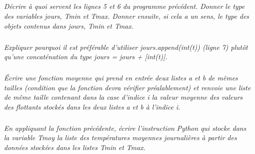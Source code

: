 \documentclass[10pt]{article}
\newif\ifprof
\begin{document}
\subparagraph{}
\textit{Décrire à quoi servent les lignes 5 et 6 du programme précédent. Donner le type des variables jours,
\textsf{Tmin} et \textsf{Tmax}. Donner ensuite, si cela a un sens, le type des objets contenus dans \textsf{jours}, \textsf{Tmin} et \textsf{Tmax}.}
\ifprof
\begin{corrige}
La ligne 5 permet d'ignorer les lignes (de commentaires) contenant le caractère \#.
La ligne 6 permet de diviser une ligne en 3 chaînes de caractères. La ligne est séparée par les points virgules.

\textsf{jours} est une liste d'entiers. \textsf{Tmin} et \textsf{Tmax} sont des listes de flottants. 

\end{corrige}
\else
\fi


\subparagraph{}
\textit{Expliquer pourquoi il est préférable d’utiliser \textsf{jours.append(int(t))} (ligne 7) plutôt qu’une concaténation du type \textsf{jours = jours + [int(t)]}.}
\ifprof
\begin{corrige}
La méthode \textsf{append} permet d'ajouter un élément à la liste sans changer sa référence (son adresse). 

Lors de la concaténation, un nouvel objet (avec une nouvelle adresse est crée). On peut supposer que lorsque la liste grandie, une concaténation et la création d'un nouvel objet prendra davantage de temps que l'utilisation de la méthode \textsf{append}.
\end{corrige}
\else
\fi


\subparagraph{}
\textit{Écrire une fonction \textsf{moyenne} qui prend en entrée deux listes \textsf{a} et \textsf{b} de mêmes tailles (condition que
la fonction devra vérifier préalablement) et renvoie une liste de même taille contenant dans la case
d’indice \textsf{i} la valeur moyenne des valeurs des flottants stockés dans les deux listes \textsf{a} et \textsf{b} à l’indice \textsf{i}.}
\ifprof
\begin{corrige}
\begin{py}
\begin{python}
def moyenne(a,b):
    if(len(a)!=len(b)):
        return None
    moy = []
    for i in range(len(a)):
        moy.append((a[i]+b[i])/2)
    return moy
\end{python}
\end{py}

\end{corrige}
\else
\fi


\subparagraph{}
\textit{En appliquant la fonction précédente, écrire l’instruction Python qui stocke dans la variable \textsf{Tmoy} la liste des températures moyennes journalières à partir des données stockées dans les listes \textsf{Tmin} et \textsf{Tmax}.}
\ifprof
\begin{corrige}
\begin{py}
\begin{python}
>>> Tmoy = moyenne(Tmin,Tmax)
\end{python}
\end{py}
\end{corrige}
\else
\fi
\end{document}
